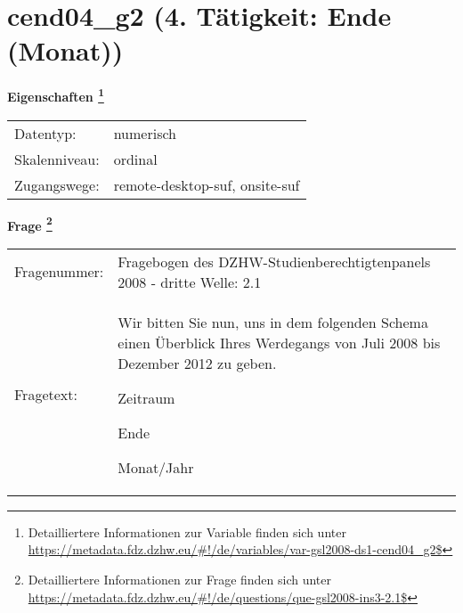 
    \setcounter{footnote}{0}

    \vspace*{-1.8cm}
	\section{cend04\_g2 (4. Tätigkeit: Ende (Monat))}
	\label{section:cend04_g2}



    \vspace*{0.5cm}
    \noindent\textbf{Eigenschaften
	\footnote{Detailliertere Informationen zur Variable finden sich unter
		\url{https://metadata.fdz.dzhw.eu/\#!/de/variables/var-gsl2008-ds1-cend04_g2$}}}\\
	\begin{tabularx}{\hsize}{@{}lX}
	Datentyp: & numerisch \\
	Skalenniveau: & ordinal \\
	Zugangswege: &
	  remote-desktop-suf, 
	  onsite-suf
 \\
    \end{tabularx}



				\vspace*{0.5cm}
                \noindent\textbf{Frage
	                \footnote{Detailliertere Informationen zur Frage finden sich unter
		              \url{https://metadata.fdz.dzhw.eu/\#!/de/questions/que-gsl2008-ins3-2.1$}}}\\
				\begin{tabularx}{\hsize}{@{}lX}
					Fragenummer: &
					  Fragebogen des DZHW-Studienberechtigtenpanels 2008 - dritte Welle:
					  2.1
 \\
					Fragetext: & Wir bitten Sie nun, uns in dem folgenden Schema einen Überblick Ihres Werdegangs von Juli 2008 bis Dezember 2012 zu geben.\par  Zeitraum\par  Ende\par  Monat/Jahr \\
				\end{tabularx}





